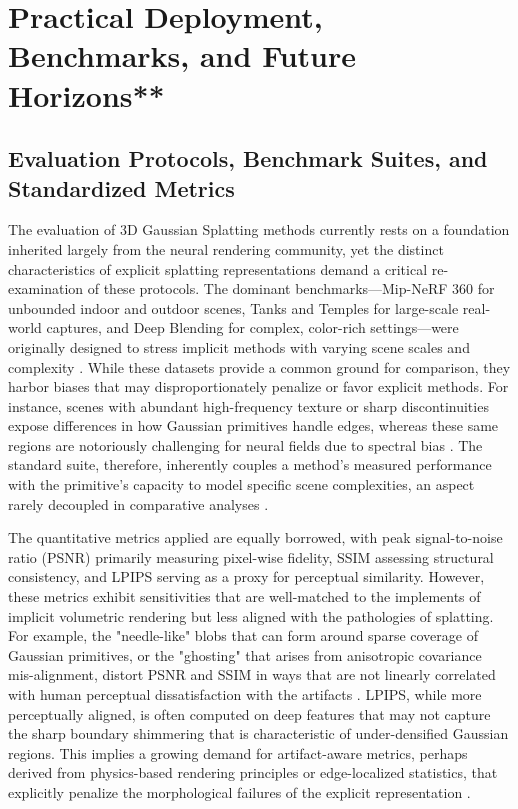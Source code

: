 \documentclass[11pt,a4paper]{article}
\begin{document}
\section{Practical Deployment, Benchmarks, and Future Horizons**}



\subsection{Evaluation Protocols, Benchmark Suites, and Standardized Metrics}


The evaluation of 3D Gaussian Splatting methods currently rests on a foundation inherited largely from the neural rendering community, yet the distinct characteristics of explicit splatting representations demand a critical re-examination of these protocols. The dominant benchmarks---Mip-NeRF 360 for unbounded indoor and outdoor scenes, Tanks and Temples for large-scale real-world captures, and Deep Blending for complex, color-rich settings---were originally designed to stress implicit methods with varying scene scales and complexity \cite{arxiv:2308.04079v1,arxiv:2401.03890v2}. While these datasets provide a common ground for comparison, they harbor biases that may disproportionately penalize or favor explicit methods. For instance, scenes with abundant high-frequency texture or sharp discontinuities expose differences in how Gaussian primitives handle edges, whereas these same regions are notoriously challenging for neural fields due to spectral bias \cite{arxiv:2411.14974v3}. The standard suite, therefore, inherently couples a method's measured performance with the primitive's capacity to model specific scene complexities, an aspect rarely decoupled in comparative analyses \cite{arxiv:2504.01844v1,arxiv:2502.19457v1}.

The quantitative metrics applied are equally borrowed, with peak signal-to-noise ratio (PSNR) primarily measuring pixel-wise fidelity, SSIM assessing structural consistency, and LPIPS serving as a proxy for perceptual similarity. However, these metrics exhibit sensitivities that are well-matched to the implements of implicit volumetric rendering but less aligned with the pathologies of splatting. For example, the "needle-like" blobs that can form around sparse coverage of Gaussian primitives, or the "ghosting" that arises from anisotropic covariance mis-alignment, distort PSNR and SSIM in ways that are not linearly correlated with human perceptual dissatisfaction with the artifacts \cite{arxiv:2403.11134v2}. LPIPS, while more perceptually aligned, is often computed on deep features that may not capture the sharp boundary shimmering that is characteristic of under-densified Gaussian regions. This implies a growing demand for artifact-aware metrics, perhaps derived from physics-based rendering principles or edge-localized statistics, that explicitly penalize the morphological failures of the explicit representation \cite{arxiv:2411.12440v3}.
\end{document}
